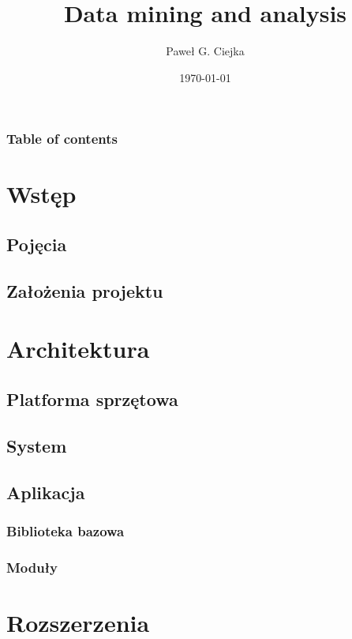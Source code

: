 \documentclass{beamer}
\title[Data mining and analysis]{Data mining and analysis}
\author[Ciejka, P. G.]{Paweł G. Ciejka}
\institute[RobCo]{RobCo Sp. z o. o. - Poland}
\date{\today}
\begin{document}
\begin{frame}
 \maketitle
\end{frame}

\begin{frame}
\frametitle{Table of contents}
 \tableofcontents
\end{frame}

	\section{Wstęp}
        \subsection{Pojęcia}
		
		\subsection{Założenia projektu} 
		
    \section{Architektura}
    
        \subsection{Platforma sprzętowa}
        
        \subsection{System} 
        
        \subsection{Aplikacja} 
        
            \subsubsection{Biblioteka bazowa}
            
            \subsubsection{Moduły}
            
	\section{Rozszerzenia}
	
\end{document}
